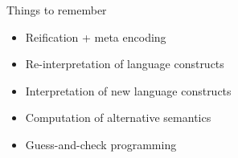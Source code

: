 \begin{frame}{Things to remember}
  \bigskip
  \begin{itemize}
  \item Reification + meta encoding
    \medskip
  \item Re-interpretation of language constructs
  \item Interpretation of new language constructs
    \medskip
  \item Computation of alternative semantics
    \medskip
  \item Guess-and-check programming
  \end{itemize}
\end{frame}
%
